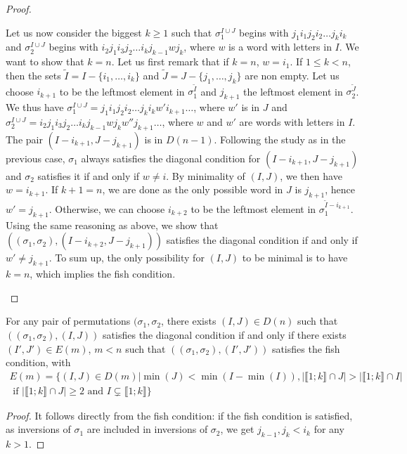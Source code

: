 \begin{proof}
\begin{itemize}
Let us now consider the biggest $k\geq 1$ such that $\sigma^{I \cup J}_1$ begins with $j_1 i_1 j_2 i_2 \ldots j_k i_k$ and $\sigma^{I \cup J}_2$ begins with $i_2 j_1 i_3 j_2\ldots i_k j_{k-1} w j_k$, where $w$ is a word with letters in $I$. We want to show that $k=n$. Let us first remark that if $k=n$, $w=i_1$. If $1\leq k<n$, then the sets $\tilde{I}=I-\{i_1, \ldots, i_k\}$ and $\tilde{J}=J-\{j_1, \ldots, j_k\}$ are non empty. Let us choose $i_{k+1}$ to be the leftmost element in $\sigma^{\tilde{I}}_1$ and $j_{k+1}$ the leftmost element in $\sigma^{\tilde{J}}_2$. We thus have $\sigma^{I \cup J}_1=j_1 i_1 j_2 i_2 \ldots j_k i_k w' i_{k+1}\ldots$, where $w'$ is in $J$ and $\sigma^{I \cup J}_2= i_2 j_1 i_3 j_2\ldots i_k j_{k-1} w j_k w'' j_{k+1}\ldots $, where $w$ and $w'$ are words with letters in $I$. The pair $(I-i_{k+1},J-j_{k+1})$ is in $D(n-1)$. Following the study as in the previous case, $\sigma_1$ always satisfies the diagonal condition for $(I-i_{k+1},J-j_{k+1})$ and $\sigma_2$ satisfies it if and only if $w \neq i$. By minimality of $(I,J)$, we then have $w=i_{k+1}$. If $k+1=n$, we are done as the only possible word in $J$ is $j_{k+1}$, hence $w'=j_{k+1}$. Otherwise, we can choose $i_{k+2}$ to be the leftmost element in $\sigma_1^{\tilde{I}-i_{k+1}}$. Using the same reasoning as above, we show that $((\sigma_1, \sigma_2),(I-i_{k+2},J-j_{k+1}))$ satisfies the diagonal condition if and only if $w'\neq j_{k+1}$. To sum up, the only possibility for $(I,J)$ to be minimal is to have $k=n$, which implies the fish condition.
\end{itemize}
\end{proof}

\begin{corollary} For any pair of permutations $(\sigma_1, \sigma_2$, there exists $(I,J) \in D(n)$ such that $((\sigma_1, \sigma_2),(I,J))$ satisfies the diagonal condition if and only if there exists $(I',J') \in E(m)$, $m<n$ such that $((\sigma_1, \sigma_2),(I',J'))$ satisfies the fish condition, with 
\begin{multline}
E(m)=\{(I,J)\in D(m)| \min(J)<\min(I-\min(I)), |\llbracket 1; k \rrbracket \cap J| > |\llbracket 1; k \rrbracket \cap I| \\ \text{ if } |\llbracket 1; k \rrbracket \cap J| \geq 2 \text{ and } I \subsetneq \llbracket 1; k \rrbracket \}
\end{multline}
\end{corollary}

\begin{proof}
It follows directly from the fish condition: if the fish condition is satisfied, as inversions of $\sigma_1$ are included in inversions of $\sigma_2$, we get $j_{k-1},j_k<i_k$ for any $k>1$.
\end{proof}

